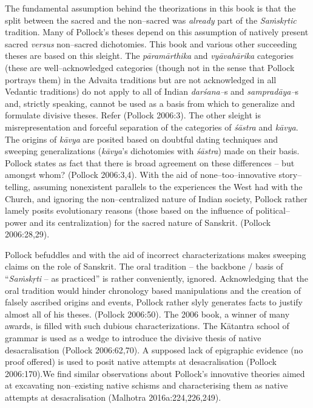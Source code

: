 The fundamental assumption behind the theorizations in this book is that the split between the sacred and the non–sacred was \textit{already} part of the \textit{Saṁskṛtic} tradition. Many of Pollock's theses depend on this assumption of natively present sacred \textit{versus} non–sacred dichotomies. This book and various other succeeding theses are based on this sleight. The \textit{pāramārthika} and \textit{vyāvahārika} categories (these are well–acknowledged categories (though not in the sense that Pollock portrays them) in the Advaita traditions but are not acknowledged in all Vedantic traditions) do not apply to all of Indian \textit{darśana–}s and \textit{sampradāya–}s and, strictly speaking, cannot be used as a basis from which to generalize and formulate divisive theses. Refer (Pollock 2006:3). The other sleight is misrepresentation and forceful separation of the categories of \textit{śāstra} and \textit{kāvya}. The origins of \textit{kāvya} are posited based on doubtful dating techniques and sweeping generalizations (\textit{kāvya}'s dichotomies with \textit{śāstra}) made on their basis. Pollock states as fact that there is broad agreement on these differences – but amongst whom? (Pollock 2006:3,4). With the aid of none–too–innovative story–telling, assuming nonexistent parallels to the experiences the West had with the Church, and ignoring the non–centralized nature of Indian society, Pollock rather lamely posits evolutionary reasons (those based on the influence of political–power and its centralization) for the sacred nature of Sanskrit. (Pollock 2006:28,29).

Pollock befuddles and with the aid of incorrect characterizations makes sweeping claims on the role of Sanskrit. The oral tradition – the backbone / basis of “\textit{Saṁskṛti} – as practiced” is rather conveniently, ignored. Acknowledging that the oral tradition would hinder chronology based manipulations and the creation of falsely ascribed origins and events, Pollock rather slyly generates facts to justify almost all of his theses. (Pollock 2006:50). The 2006 book, a winner of many awards, is filled with such dubious characterizations. The Kātantra school of grammar is used as a wedge to introduce the divisive thesis of native desacralisation (Pollock 2006:62,70). A supposed lack of epigraphic evidence (no proof offered) is used to posit native attempts at desacralisation (Pollock 2006:170).We find similar observations about Pollock's innovative theories aimed at excavating non–existing native schisms and characterising them as native attempts at desacralisation (Malhotra 2016a:224,226,249).


